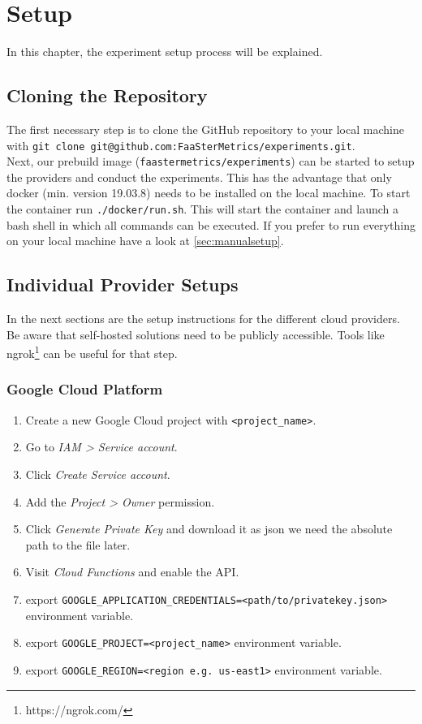 \documentclass[../main.tex]{subfiles}
\begin{document}
\section{Setup}\label{sec:setup}
In this chapter, the experiment setup process will be explained.


\subsection{Cloning the Repository}\label{sec:clonesetup}
The first necessary step is to clone the GitHub repository to your local machine with \texttt{git clone git@github.com:FaaSterMetrics/experiments.git}. \\
Next, our prebuild image (\texttt{faastermetrics/experiments}) can be started to setup the providers and conduct the experiments. This has the advantage that only docker (min. version 19.03.8) needs to be installed on the local machine. To start the container run \texttt{./docker/run.sh}. This will start the container and launch a bash shell in which all commands can be executed.
If you prefer to run everything on your local machine have a look at \ref{sec:manualsetup}.

\subsection{Individual Provider Setups}\label{sec:providersetup}

In the next sections are the setup instructions for the different cloud providers. Be aware that self-hosted solutions need to be publicly accessible. Tools like ngrok\footnote{https://ngrok.com/} can be useful for that step.

\subsubsection{Google Cloud Platform}\label{sec:providersetupgcp}

\begin{enumerate}
\item Create a new Google Cloud project with \texttt{<project\_name>}.
\item Go to \textit{IAM > Service account}.
\item Click \textit{Create Service account}.
\item Add the \textit{Project > Owner} permission.
\item Click \textit{Generate Private Key} and download it as json we need the absolute path to the file later.
\item Visit \textit{Cloud Functions} and enable the API.
\item export \texttt{GOOGLE\_APPLICATION\_CREDENTIALS=<path/to/privatekey.json>} environment variable.
\item export \texttt{GOOGLE\_PROJECT=<project\_name>} environment variable.
\item export \texttt{GOOGLE\_REGION=<region e.g. us-east1>} environment variable.
\end{enumerate}
\end{document}
